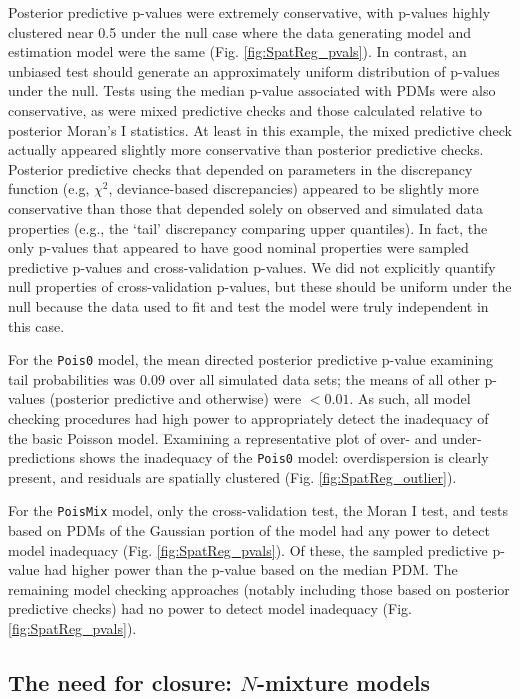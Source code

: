 \documentclass[12pt,english]{article}
\begin{document}
\begin{spacing}{1.9}
Posterior predictive p-values were extremely conservative, with
p-values highly clustered near 0.5 under the null case where the data
generating model and estimation model were the same
(Fig. \ref{fig:SpatReg_pvals}).  In contrast, an unbiased test should
generate an approximately uniform distribution of p-values under the
null.  Tests using the median p-value associated with PDMs were also
conservative, as were mixed predictive checks and those calculated
relative to posterior Moran's I statistics.  At least in this example,
the mixed predictive check actually appeared slightly more
conservative than posterior predictive checks.  Posterior predictive
checks that depended on parameters in the discrepancy function (e.g,
$\chi^2$, deviance-based discrepancies) appeared to be slightly more
conservative than those that depended solely on observed and simulated
data properties (e.g., the `tail' discrepancy comparing upper
quantiles).  In fact, the only p-values that appeared to have good
nominal properties were sampled predictive p-values and
cross-validation p-values.  We did not explicitly quantify null
properties of cross-validation p-values, but these should be uniform
under the null because the data used to fit and test the model were
truly independent in this case.

For the \texttt{Pois0} model, the mean directed posterior predictive
p-value examining tail probabilities was 0.09 over all simulated data
sets; the means of all other p-values (posterior predictive and
otherwise) were $<0.01$.  As such, all
model checking procedures had high power to appropriately detect the
inadequacy of the basic Poisson model.  Examining a representative plot of
over- and under-predictions shows the inadequacy of the
\texttt{Pois0} model: overdispersion is clearly present, and residuals are spatially
clustered (Fig. \ref{fig:SpatReg_outlier}).

For the \texttt{PoisMix} model, only the cross-validation test, the
Moran I test, and tests based on PDMs of the Gaussian portion of the
model had any power to detect model inadequacy
(Fig. \ref{fig:SpatReg_pvals}).  Of these, the sampled predictive
p-value had higher power than the p-value based on the median PDM.
The remaining model checking approaches (notably including those based
on posterior predictive checks) had no power to detect model
inadequacy (Fig. \ref{fig:SpatReg_pvals}).



\subsection{The need for closure: $N$-mixture models}


\end{spacing}
\end{document}
